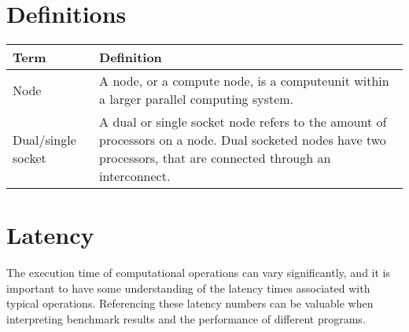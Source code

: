 

\section{Definitions}

\begin{table}[H]
    \begin{center}
        \begin{tabular}[c]{|p{4cm}|p{8cm}|}
            \hline
             \textbf{Term}&\textbf{Definition}  \\
            \hline
             Node&A node, or a compute node, is a computeunit within a larger parallel computing system.    \\
            \hline
                 Dual/single socket&A dual or single socket node refers to the amount of processors on a node. Dual socketed nodes have two processors, that are connected through an interconnect.\\
            \hline
        \end{tabular}
    \end{center}
\end{table}

\section{Latency}
The execution time of computational operations can vary significantly, and it is important to have some understanding of the latency times associated with typical operations. Referencing these latency numbers can be valuable when interpreting benchmark results and the performance of different programs.


